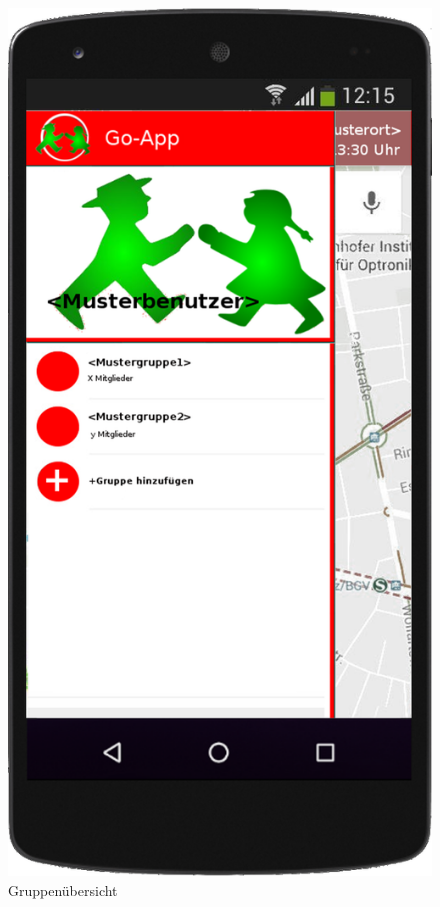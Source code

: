 \begin{figure}
	\caption{Gruppenübersicht}
	\includegraphics[scale = 0.2]{resources/images/handy/gruppenuebersicht.png}
\end{figure}

